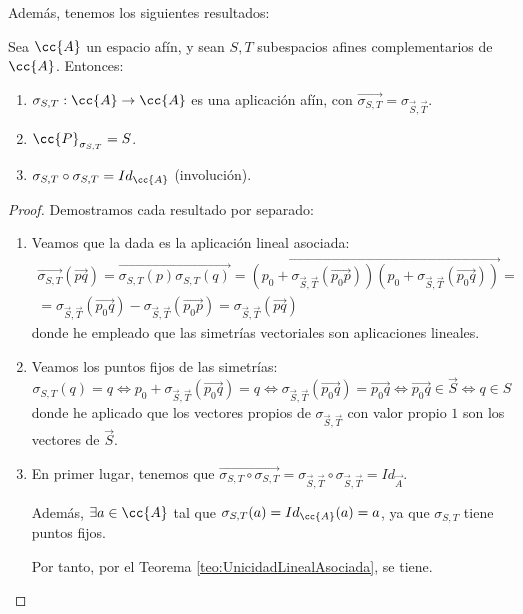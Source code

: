 Además, tenemos los siguientes resultados:
\begin{prop}
    Sea $\cc{A}$ un espacio afín, y sean $S,T$ subespacios afines complementarios de $\cc{A}$. Entonces:
    \begin{enumerate}
        \item $\sigma_{S,T}:\cc{A}\to \cc{A}$ es una aplicación afín, con $\vec{\sigma_{S,T}}=\sigma_{\vec{S}, \vec{T}}$.
        \item $\cc{P}_{\sigma_{S,T}}=S$.
        \item $\sigma_{S,T}\circ \sigma_{S,T} =Id_{\cc{A}}$ (involución).
    \end{enumerate}
\end{prop}
\begin{proof} Demostramos cada resultado por separado:
\begin{enumerate}
    \item Veamos que la dada es la aplicación lineal asociada:
    \begin{multline*}
        \vec{\sigma_{S,T}}(\vec{pq}) = \vec{\sigma_{S,T}(p)\sigma_{S,T}(q)} = \vec{(p_0+\sigma_{\vec{S}, \vec{T}}(\vec{p_0p}))(p_0+\sigma_{\vec{S}, \vec{T}}(\vec{p_0q}))} =\\= \sigma_{\vec{S}, \vec{T}}(\vec{p_0q})-\sigma_{\vec{S}, \vec{T}}(\vec{p_0p}) = \sigma_{\vec{S}, \vec{T}}(\vec{pq})
    \end{multline*}
    donde he empleado que las simetrías vectoriales son aplicaciones lineales.

    \item Veamos los puntos fijos de las simetrías:
    \begin{equation*}
        \sigma_{S,T}(q)=q \Longleftrightarrow p_0 + \sigma_{\vec{S}, \vec{T}}(\vec{p_0q}) = q
        \Longleftrightarrow \sigma_{\vec{S}, \vec{T}}(\vec{p_0q}) = \vec{p_0q}
        \Longleftrightarrow \vec{p_0q}\in \vec{S}
        \Longleftrightarrow q\in S
    \end{equation*}
    donde he aplicado que los vectores propios de $\sigma_{\vec{S}, \vec{T}}$ con valor propio $1$ son los vectores de $\vec{S}$.

    \item En primer lugar, tenemos que $\vec{\sigma_{S,T}\circ \sigma_{S,T}} = \sigma_{\vec{S}, \vec{T}}\circ \sigma_{\vec{S}, \vec{T}} = Id_{\vec{A}}$.

    Además, $\exists a\in \cc{A}$ tal que $\sigma_{S,T}(a)=Id_{\cc{A}}(a)=a$, ya que $\sigma_{S,T}$ tiene puntos fijos.

    Por tanto, por el Teorema \ref{teo:UnicidadLinealAsociada}, se tiene.
\end{enumerate}
\end{proof}

